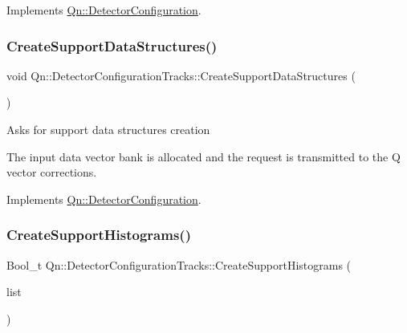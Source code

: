 Implements \mbox{\hyperlink{classQn_1_1DetectorConfiguration_a9f527d4c584e6bd79b6b8eb0b7f5413a}{Qn\+::\+Detector\+Configuration}}.

\mbox{\label{classQn_1_1DetectorConfigurationTracks_aef11ff21d7c3fe4b612fe7c886023c7a}} 
\subsubsection{\texorpdfstring{Create\+Support\+Data\+Structures()}{CreateSupportDataStructures()}}
{\footnotesize\ttfamily void Qn\+::\+Detector\+Configuration\+Tracks\+::\+Create\+Support\+Data\+Structures (\begin{DoxyParamCaption}{ }\end{DoxyParamCaption})\hspace{0.3cm}{\ttfamily [virtual]}}

Asks for support data structures creation

The input data vector bank is allocated and the request is transmitted to the Q vector corrections. 

Implements \mbox{\hyperlink{classQn_1_1DetectorConfiguration_a664f65925f22f8f02c1a216f77b533ce}{Qn\+::\+Detector\+Configuration}}.

\mbox{\label{classQn_1_1DetectorConfigurationTracks_ab32b2790ce27053d640e2682dcc9223d}} 
\subsubsection{\texorpdfstring{Create\+Support\+Histograms()}{CreateSupportHistograms()}}
{\footnotesize\ttfamily Bool\+\_\+t Qn\+::\+Detector\+Configuration\+Tracks\+::\+Create\+Support\+Histograms (\begin{DoxyParamCaption}\item[{T\+List $\ast$}]{list }\end{DoxyParamCaption})\hspace{0.3cm}{\ttfamily [virtual]}}

